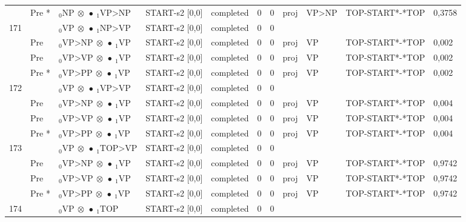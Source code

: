 \documentclass[10pt]{article}
\begin{document}
\begin{longtable}[htbp]{lllllllllll}
 & Pre *& $ {}_0 \textrm{NP} \  \otimes \  \bullet \ {}_{1} \textrm{VP>NP} $ & START-s2 [0,0] & completed & 0 & 0 & proj & VP>NP & TOP-START*-*TOP & 0,3758 \\ 
171 & & $ {}_0 \textrm{VP} \  \otimes \  \bullet \ {}_{1} \textrm{NP>VP} $ & START-s2 [0,0] & completed & 0 & 0 & & & & \\ 
 & Pre & $ {}_0 \textrm{VP>NP} \  \otimes \  \bullet \ {}_{1} \textrm{VP} $ & START-s2 [0,0] & completed & 0 & 0 & proj & VP & TOP-START*-*TOP & 0,002 \\ 
 & Pre & $ {}_0 \textrm{VP>VP} \  \otimes \  \bullet \ {}_{1} \textrm{VP} $ & START-s2 [0,0] & completed & 0 & 0 & proj & VP & TOP-START*-*TOP & 0,002 \\ 
 & Pre *& $ {}_0 \textrm{VP>PP} \  \otimes \  \bullet \ {}_{1} \textrm{VP} $ & START-s2 [0,0] & completed & 0 & 0 & proj & VP & TOP-START*-*TOP & 0,002 \\ 
172 & & $ {}_0 \textrm{VP} \  \otimes \  \bullet \ {}_{1} \textrm{VP>VP} $ & START-s2 [0,0] & completed & 0 & 0 & & & & \\ 
 & Pre & $ {}_0 \textrm{VP>NP} \  \otimes \  \bullet \ {}_{1} \textrm{VP} $ & START-s2 [0,0] & completed & 0 & 0 & proj & VP & TOP-START*-*TOP & 0,004 \\ 
 & Pre & $ {}_0 \textrm{VP>VP} \  \otimes \  \bullet \ {}_{1} \textrm{VP} $ & START-s2 [0,0] & completed & 0 & 0 & proj & VP & TOP-START*-*TOP & 0,004 \\ 
 & Pre *& $ {}_0 \textrm{VP>PP} \  \otimes \  \bullet \ {}_{1} \textrm{VP} $ & START-s2 [0,0] & completed & 0 & 0 & proj & VP & TOP-START*-*TOP & 0,004 \\ 
173 & & $ {}_0 \textrm{VP} \  \otimes \  \bullet \ {}_{1} \textrm{TOP>VP} $ & START-s2 [0,0] & completed & 0 & 0 & & & & \\ 
 & Pre & $ {}_0 \textrm{VP>NP} \  \otimes \  \bullet \ {}_{1} \textrm{VP} $ & START-s2 [0,0] & completed & 0 & 0 & proj & VP & TOP-START*-*TOP & 0,9742 \\ 
 & Pre & $ {}_0 \textrm{VP>VP} \  \otimes \  \bullet \ {}_{1} \textrm{VP} $ & START-s2 [0,0] & completed & 0 & 0 & proj & VP & TOP-START*-*TOP & 0,9742 \\ 
 & Pre *& $ {}_0 \textrm{VP>PP} \  \otimes \  \bullet \ {}_{1} \textrm{VP} $ & START-s2 [0,0] & completed & 0 & 0 & proj & VP & TOP-START*-*TOP & 0,9742 \\ 
174 & & $ {}_0 \textrm{VP} \  \otimes \  \bullet \ {}_{1} \textrm{TOP} $ & START-s2 [0,0] & completed & 0 & 0 & & & & \\ 

\end{longtable}
\end{document}
